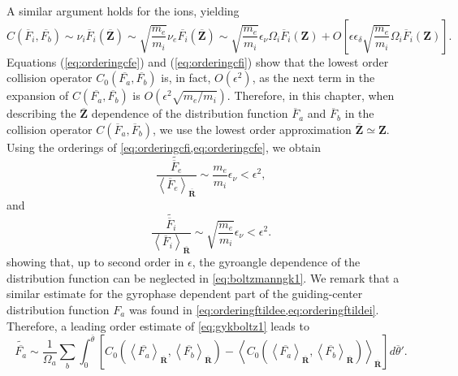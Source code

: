 %
A similar argument holds for the ions, yielding
%
\begin{equation}
    C(\overline F_i,\overline{F_b}) \sim \nu_i \overline F_i(\overline{\mathbf Z}) \sim \sqrt{\frac{m_e}{m_i}}\nu_e \overline{F_i}(\overline{\mathbf Z})\sim \sqrt{\frac{m_e}{m_i}}\epsilon_\nu \Omega_i \overline F_i(\mathbf Z) +O\left[\epsilon \epsilon_\delta \sqrt{\frac{m_e}{m_i}}\Omega_i \overline F_i(\mathbf Z)\right].
\label{eq:orderingcfi}
\end{equation}
%
Equations (\ref{eq:orderingcfe}) and (\ref{eq:orderingcfi}) show that the lowest order collision operator $C_0(\overline{F_a},\overline{F_b})$ is, in fact, $O(\epsilon^2)$, as the next term in the expansion of $C(\overline{F_a},\overline{F_b})$ is $O(\epsilon^2 \sqrt{m_e/m_i})$.
%
Therefore, in this chapter, when describing the $\overline{\mathbf Z}$ dependence of the distribution function $\overline F_a$ and $\overline F_b$ in the collision operator $C(\overline F_a,\overline F_b)$, we use the lowest order approximation $\overline{ \mathbf Z} \simeq \mathbf Z$.
%
Using the orderings of \cref{eq:orderingcfi,eq:orderingcfe}, we obtain
%
\begin{equation}
    \frac{\widetilde {\overline F_e}}{\left< \overline F_e \right>_{\overline{\mathbf{R}}}} \sim \frac{m_e}{m_i}\epsilon_\nu<\epsilon^2,
    \label{eq:orderingftildee1}
\end{equation}
%
and
%
\begin{equation}
    \frac{\widetilde {\overline F_i}}{\left< \overline F_i \right>_{\overline{\mathbf{R}}}} \sim \sqrt{\frac{m_e}{m_i}}\epsilon_\nu<\epsilon^2.
    \label{eq:orderingftildei1}
\end{equation}
%
showing that, up to second order in $\epsilon$, the gyroangle dependence of the distribution function can be neglected in \cref{eq:boltzmanngk1}.
%
We remark that a similar estimate for the gyrophase dependent part of the guiding-center distribution function $F_a$ was found in \cref{eq:orderingftildee,eq:orderingftildei}.
%
Therefore, a leading order estimate of \cref{eq:gykboltz1} leads to
%
\begin{equation}
    \widetilde {\overline{F_a}} \sim \frac{1}{\Omega_a} \sum_b \int_0^{\overline \theta} \left[C_0\left(\left<\overline{F_a}\right>_{\overline{\mathbf{R}}},\left<\overline{F_b}\right>_{\overline{\mathbf{R}}}\right)-\left<C_0\left(\left<\overline{F_a}\right>_{\overline{\mathbf{R}}},\left<\overline{F_b}\right>_{\overline{\mathbf{R}}}\right)\right>_{\overline{\mathbf{R}}}\right]d{\overline{\theta}'}.
\end{equation}
